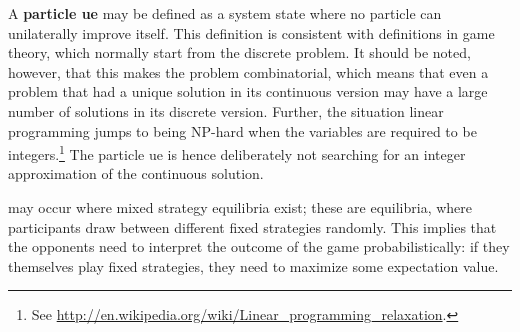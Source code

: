 A \textbf{particle \gls{ue}} may be defined as a system state\corr{,}{} where no
particle can unilaterally improve itself.
This definition is consistent with definitions in game theory, which normally
start from the discrete problem.
It should be noted, however, that this makes the problem combinatorial, which
means that even a problem that had a unique solution in its continuous version
may have a large number of solutions in its discrete version.
Further,  the situation  linear
programming jumps to being NP-hard when the variables are required to be
integers.\footnote{%
See \url{http://en.wikipedia.org/wiki/Linear_programming_relaxation}.
} The particle \gls{ue} is hence deliberately not searching for
an integer approximation of the continuous solution.

 may occur where mixed
strategy equilibria exist; these are equilibria, where participants draw between different fixed strategies
randomly.  This implies that the opponents need to interpret the outcome of the
game probabilistically:
 if they themselves play fixed strategies, they need to
maximize some expectation value.

